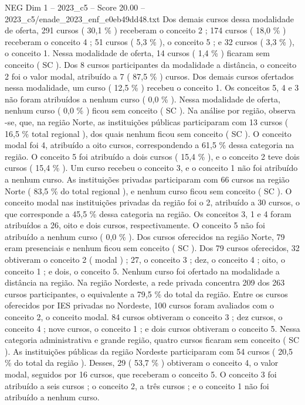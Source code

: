 \begin{textsample}{NEG Dim 1 – 2023\_c5 – Score 20.00 – 2023\_c5/enade\_2023\_enf\_e0eb49dd48.txt}
Dos demais cursos dessa modalidade de oferta, 291 cursos ( 30,1 \% ) receberam o conceito 2 ; 174 cursos ( 18,0 \% ) receberam o conceito 4 ; 51 cursos ( 5,3 \% ), o conceito 5 ; e 32 cursos ( 3,3 \% ), o conceito 1.
Nessa modalidade de oferta, 14 cursos ( 1,4 \% ) ficaram sem conceito ( SC ).
Dos 8 cursos participantes da modalidade a distância, o conceito 2 foi o valor modal, atribuído a 7 ( 87,5 \% ) cursos.
Dos demais cursos ofertados nessa modalidade, um curso ( 12,5 \% ) recebeu o conceito 1.
Os conceitos 5, 4 e 3 não foram atribuídos a nenhum curso ( 0,0 \% ).
Nessa modalidade de oferta, nenhum curso ( 0,0 \% ) ficou sem conceito ( SC ).
Na análise por região, observa -se, que, na região Norte, as instituições públicas participaram com 13 cursos ( 16,5 \% total regional ), dos quais nenhum ficou sem conceito ( SC ).
O conceito modal foi 4, atribuído a oito cursos, correspondendo a 61,5 \% dessa categoria na região.
O conceito 5 foi atribuído a dois cursos ( 15,4 \% ), e o conceito 2 teve dois cursos ( 15,4 \% ).
Um curso recebeu o conceito 3, e o conceito 1 não foi atribuído a nenhum curso.
As instituições privadas participaram com 66 cursos na região Norte ( 83,5 \% do total regional ), e nenhum curso ficou sem conceito ( SC ).
O conceito modal nas instituições privadas da região foi o 2, atribuído a 30 cursos, o que corresponde a 45,5 \% dessa categoria na região.
Os conceitos 3, 1 e 4 foram atribuídos a 26, oito e dois cursos, respectivamente.
O conceito 5 não foi atribuído a nenhum curso ( 0,0 \% ).
Dos cursos oferecidos na região Norte, 79 eram presenciais e nenhum ficou sem conceito ( SC ).
Dos 79 cursos oferecidos, 32 obtiveram o conceito 2 ( modal ) ; 27, o conceito 3 ; dez, o conceito 4 ; oito, o conceito 1 ; e dois, o conceito 5.
Nenhum curso foi ofertado na modalidade a distância na região.
Na região Nordeste, a rede privada concentra 209 dos 263 cursos participantes, o equivalente a 79,5 \% do total da região.
Entre os cursos oferecidos por IES privadas no Nordeste, 100 cursos foram avaliados com o conceito 2, o conceito modal. 84 cursos obtiveram o conceito 3 ; dez cursos, o conceito 4 ; nove cursos, o conceito 1 ; e dois cursos obtiveram o conceito 5.
Nessa categoria administrativa e grande região, quatro cursos ficaram sem conceito ( SC ).
As instituições públicas da região Nordeste participaram com 54 cursos ( 20,5 \% do total da região ).
Desses, 29 ( 53,7 \% ) obtiveram o conceito 4, o valor modal, seguidos por 16 cursos, que receberam o conceito 5.
O conceito 3 foi atribuído a seis cursos ; o conceito 2, a três cursos ; e o conceito 1 não foi atribuído a nenhum curso.

\end{textsample}
